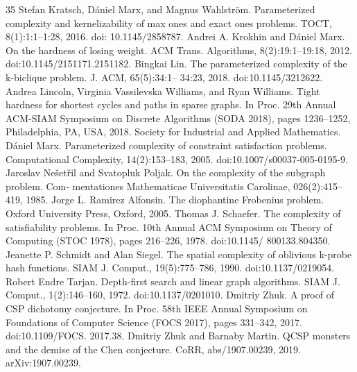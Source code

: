 \documentclass[10pt,a4paper]{article}
\begin{document}
\begin{thebibliography}{35}
Stefan Kratsch, Dániel Marx, and Magnus Wahlström. Parameterized complexity and kernelizability of max ones and exact ones problems. TOCT, 8(1):1:1–1:28, 2016. doi: 10.1145/2858787.
Andrei A. Krokhin and Dániel Marx. On the hardness of losing weight. ACM Trans. Algorithms, 8(2):19:1–19:18, 2012. doi:10.1145/2151171.2151182.
Bingkai Lin. The parameterized complexity of the k-biclique problem. J. ACM, 65(5):34:1– 34:23, 2018. doi:10.1145/3212622.
Andrea Lincoln, Virginia Vassilevska Williams, and Ryan Williams. Tight hardness for shortest cycles and paths in sparse graphs. In Proc. 29th Annual ACM-SIAM Symposium on Discrete Algorithms (SODA 2018), pages 1236–1252, Philadelphia, PA, USA, 2018. Society for Industrial and Applied Mathematics.
Dániel Marx. Parameterized complexity of constraint satisfaction problems. Computational Complexity, 14(2):153–183, 2005. doi:10.1007/s00037-005-0195-9.
Jaroslav Nešetřil and Svatopluk Poljak. On the complexity of the subgraph problem. Com- mentationes Mathematicae Universitatis Carolinae, 026(2):415–419, 1985.
Jorge L. Ramirez Alfonsin. The diophantine Frobenius problem. Oxford University Press, Oxford, 2005.
Thomas J. Schaefer. The complexity of satisfiability problems. In Proc. 10th Annual ACM Symposium on Theory of Computing (STOC 1978), pages 216–226, 1978. doi:10.1145/ 800133.804350.
Jeanette P. Schmidt and Alan Siegel. The spatial complexity of oblivious k-probe hash functions. SIAM J. Comput., 19(5):775–786, 1990. doi:10.1137/0219054.
Robert Endre Tarjan. Depth-first search and linear graph algorithms. SIAM J. Comput., 1(2):146–160, 1972. doi:10.1137/0201010.
Dmitriy Zhuk. A proof of CSP dichotomy conjecture. In Proc. 58th IEEE Annual Symposium on Foundations of Computer Science (FOCS 2017), pages 331–342, 2017. doi:10.1109/FOCS. 2017.38.
Dmitriy Zhuk and Barnaby Martin. QCSP monsters and the demise of the Chen conjecture. CoRR, abs/1907.00239, 2019. arXiv:1907.00239.
\end{thebibliography}
\end{document}

